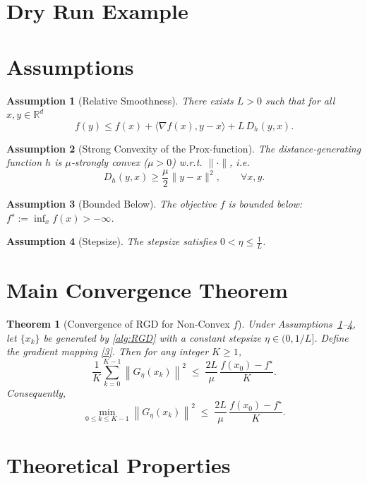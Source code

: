 \documentclass{article}
\newtheorem{assumption}{Assumption}
\newtheorem{theorem}{Theorem}
\newcommand{\grad}{\nabla}
\newcommand{\Breg}{D_{h}}
\newcommand{\norm}[1]{\left\|#1\right\|}
\begin{document}
\section*{Dry Run Example}

\newpage
\section*{Assumptions}
\begin{assumption}[Relative Smoothness]\label{ass:smooth}
There exists $L>0$ such that for all $x,y\in\mathbb R^{d}$
\[
f(y)\le f(x)+\langle \grad f(x),y-x\rangle+L\,\Breg (y,x).
\tag{A1}
\]
\end{assumption}
\begin{assumption}[Strong Convexity of the Prox‑function]\label{ass:strong}
The distance‑generating function $h$ is $\mu$‑strongly convex ($\mu>0$) w.r.t. $\|\cdot\|$, i.e.
\[
\Breg (y,x)\ge\frac{\mu}{2}\|y-x\|^{2},\qquad\forall x,y.
\tag{A2}
\]
\end{assumption}
\begin{assumption}[Bounded Below]\label{ass:bound}
The objective $f$ is bounded below: $f^\star:=\inf_{x}f(x)>-\infty$.
\end{assumption}
\begin{assumption}[Stepsize]\label{ass:stepsize}
The stepsize satisfies $0<\eta\le \frac{1}{L}$.
\end{assumption}

\section*{Main Convergence Theorem}
\begin{theorem}[Convergence of RGD for Non‑Convex $f$]\label{thm:main}
Under Assumptions~\ref{ass:smooth}–\ref{ass:stepsize}, let $\{x_k\}$ be generated by \eqref{alg:RGD} with a \emph{constant} stepsize $\eta\in(0,1/L]$. Define the gradient mapping \eqref{3}. Then for any integer $K\ge1$,
\[
\frac{1}{K}\sum_{k=0}^{K-1}\norm{G_{\eta}(x_k)}^{2}
\;\le\;
\frac{2L}{\mu}\,\frac{f(x_0)-f^\star}{K}.
\tag{4}
\]
Consequently,
\[
\min_{0\le k\le K-1}\norm{G_{\eta}(x_k)}^{2}
\;\le\;
\frac{2L}{\mu}\,\frac{f(x_0)-f^\star}{K}.
\]
\end{theorem}

\section*{Theoretical Properties}
\end{document}
